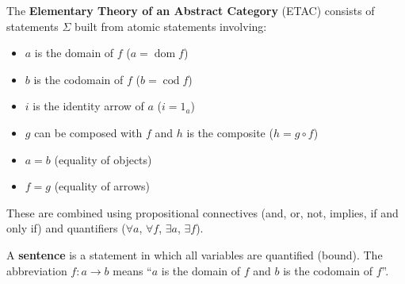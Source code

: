 The \textbf{Elementary Theory of an Abstract Category} (ETAC) consists of statements $\Sigma$ built from atomic statements involving:
\begin{itemize}
\item $a$ is the domain of $f$ \quad ($a = \operatorname{dom} f$)
\item $b$ is the codomain of $f$ \quad ($b = \operatorname{cod} f$)
\item $i$ is the identity arrow of $a$ \quad ($i = 1_a$)
\item $g$ can be composed with $f$ and $h$ is the composite \quad ($h = g \circ f$)
\item $a = b$ (equality of objects)
\item $f = g$ (equality of arrows)
\end{itemize}
These are combined using propositional connectives (and, or, not, implies, if and only if) and quantifiers ($\forall a$, $\forall f$, $\exists a$, $\exists f$).

A \textbf{sentence} is a statement in which all variables are quantified (bound).
The abbreviation $f : a \to b$ means ``$a$ is the domain of $f$ and $b$ is the codomain of $f$''.
